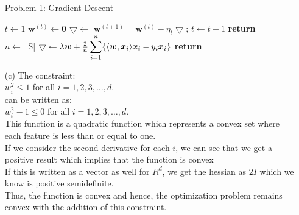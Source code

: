 \documentclass[fleqn]{article}
\begin{document}
\begin{itemize}
	\begin{algorithm}[H]
	\caption{Problem 1: Gradient Descent}
	\begin{algorithmic}[1]
	\State $t \gets 1$
	\State $\bm{w}^{(t)} \gets \bm{0}$
		\State $\bigtriangledown \gets$ 
		\State $\bm{w}^{(t+1)} = \bm{w}^{(t)} - \eta_t \bigtriangledown$; 
		\State $t \gets t + 1$
	\EndFor
	\State \textbf{return}   
	\EndProcedure
	\\
	\State $n \gets$ |S| 
	\State $\bigtriangledown \gets \lambda \bm{w} + \frac{2}{n} \smashoperator{\sum_{i = 1}^{n}} \{ \langle \bm{w}, \bm{x}_i \rangle \bm{x}_i - y_i \bm{x}_i \}$
	\State \textbf{return} \bigtriangledown
	\EndProcedure
	\end{algorithmic}
	\end{algorithm}

	\item[(c)] The constraint:\\
		$w_i^2 \leq 1$ for all $i = 1, 2, 3, \dots, d.$\\
		can be written as:\\
		$w_i^2 - 1 \leq 0$ for all $i = 1, 2, 3, \dots, d.$\\
		This function is a quadratic function which represents a convex set where each feature is less than or equal to one.\\
		If we consider the second derivative for each $i$, we can see that we get a positive result which implies that the function is convex\\
		If this is written as a vector as well for $R^d$, we get the hessian as $2I$ which we know is positive semidefinite.\\
		Thus, the function is convex and hence, the optimization problem remains convex with the addition of this constraint.\\


\end{itemize}
\end{document}
